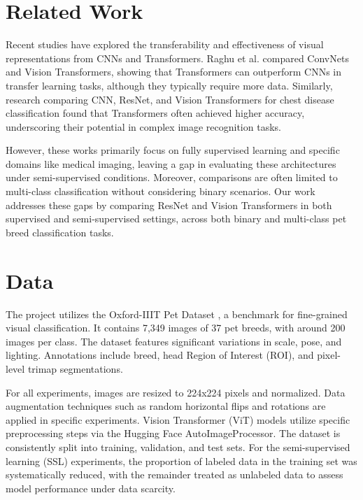 \documentclass{article}
\begin{document}


\section{Related Work}
Recent studies have explored the transferability and effectiveness of visual representations from CNNs and Transformers. Raghu et al.\cite{convnetvstransformers} compared ConvNets and Vision Transformers, showing that Transformers can outperform CNNs in transfer learning tasks, although they typically require more data. Similarly, research comparing CNN, ResNet, and Vision Transformers for chest disease classification\cite{chest} found that Transformers often achieved higher accuracy, underscoring their potential in complex image recognition tasks.

However, these works primarily focus on fully supervised learning and specific domains like medical imaging, leaving a gap in evaluating these architectures under semi-supervised conditions. Moreover, comparisons are often limited to multi-class classification without considering binary scenarios. Our work addresses these gaps by comparing ResNet and Vision Transformers in both supervised and semi-supervised settings, across both binary and multi-class pet breed classification tasks.



\section{Data}
The project utilizes the Oxford-IIIT Pet Dataset \cite{Parkhi2012}, a benchmark for fine-grained visual classification. It contains 7,349 images of 37 pet breeds, with around 200 images per class. The dataset features significant variations in scale, pose, and lighting. Annotations include breed, head Region of Interest (ROI), and pixel-level trimap segmentations.

For all experiments, images are resized to 224x224 pixels and normalized. Data augmentation techniques such as random horizontal flips and rotations are applied in specific experiments. Vision Transformer (ViT) models utilize specific preprocessing steps via the Hugging Face AutoImageProcessor. The dataset is consistently split into training, validation, and test sets. For the semi-supervised learning (SSL) experiments, the proportion of labeled data in the training set was systematically reduced, with the remainder treated as unlabeled data to assess model performance under data scarcity.
\end{document}

